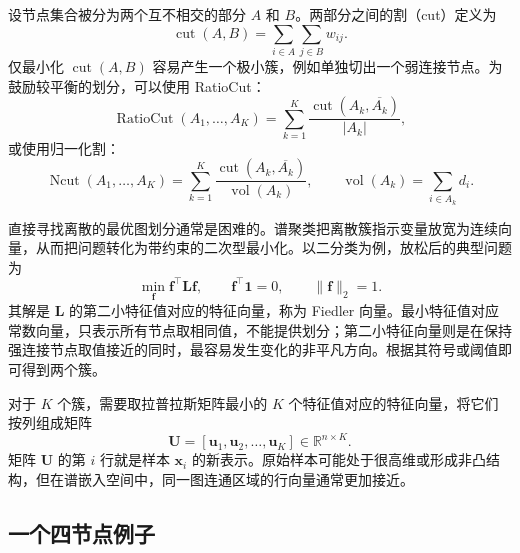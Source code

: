 \documentclass[UTF8,zihao=-4,openany]{ctexbook}
\begin{document}
设节点集合被分为两个互不相交的部分 \(A\) 和 \(B\)。两部分之间的割（cut）定义为
\begin{equation}
  \operatorname{cut}(A,B)
  =
  \sum_{i\in A}\sum_{j\in B}w_{ij}.
  \label{eq:graph-cut}
\end{equation}
仅最小化 \(\operatorname{cut}(A,B)\) 容易产生一个极小簇，例如单独切出一个弱连接节点。为鼓励较平衡的划分，可以使用 RatioCut：
\begin{equation}
  \operatorname{RatioCut}(A_1,\ldots,A_K)
  =
  \sum_{k=1}^{K}
  \frac{\operatorname{cut}(A_k,\overline{A_k})}{|A_k|},
  \label{eq:ratiocut}
\end{equation}
或使用归一化割：
\begin{equation}
  \operatorname{Ncut}(A_1,\ldots,A_K)
  =
  \sum_{k=1}^{K}
  \frac{\operatorname{cut}(A_k,\overline{A_k})}
  {\operatorname{vol}(A_k)},
  \qquad
  \operatorname{vol}(A_k)=\sum_{i\in A_k}d_i.
  \label{eq:normalized-cut}
\end{equation}

直接寻找离散的最优图划分通常是困难的。谱聚类把离散簇指示变量放宽为连续向量，从而把问题转化为带约束的二次型最小化。以二分类为例，放松后的典型问题为
\begin{equation}
  \min_{\boldsymbol f}
  \boldsymbol f^\top\boldsymbol L\boldsymbol f,
  \qquad
  \boldsymbol f^\top\boldsymbol 1=0,
  \qquad
  \|\boldsymbol f\|_2=1.
  \label{eq:spectral-relaxation}
\end{equation}
其解是 \(\boldsymbol L\) 的第二小特征值对应的特征向量，称为 Fiedler 向量。最小特征值对应常数向量，只表示所有节点取相同值，不能提供划分；第二小特征向量则是在保持强连接节点取值接近的同时，最容易发生变化的非平凡方向。根据其符号或阈值即可得到两个簇。

对于 \(K\) 个簇，需要取拉普拉斯矩阵最小的 \(K\) 个特征值对应的特征向量，将它们按列组成矩阵
\[
  \boldsymbol U
  =
  [\boldsymbol u_1,\boldsymbol u_2,\ldots,\boldsymbol u_K]
  \in\mathbb R^{n\times K}.
\]
矩阵 \(\boldsymbol U\) 的第 \(i\) 行就是样本 \(\boldsymbol{x}_i\) 的新表示。原始样本可能处于很高维或形成非凸结构，但在谱嵌入空间中，同一图连通区域的行向量通常更加接近。

\subsection{一个四节点例子}
\end{document}
